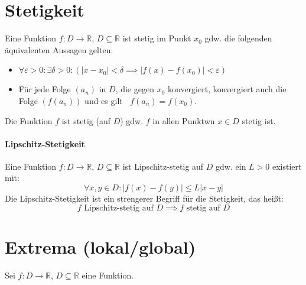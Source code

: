 \documentclass[a4paper, 11pt, accentcolor = tud3b]{tudreport}
\DeclareMathOperator{\liminfty}{\lim _ { n \rightarrow \infty }}
\newcommand{\func}[1]{$ #1 : D \rightarrow \mathbb{R} $, $ D \subseteq \mathbb{R} $}
\begin{document}
        \section{Stetigkeit}
            Eine Funktion \func{f} ist stetig im Punkt $ x _ 0 $ gdw. die folgenden äquivalenten Aussagen gelten:
            \begin{itemize}
                \item $ \forall \varepsilon > 0 : \exists \delta > 0 : (\lvert x - x _ 0 \rvert < \delta \implies \lvert f(x) - f(x _ 0) \rvert < \varepsilon) $
                \item Für jede Folge $ (a _ n) $ in $ D $, die gegen $ x _ 0 $ konvergiert, konvergiert auch die Folge $ (f(a _ n)) $ und es gilt $ \liminfty f(a _ n) = f(x _ 0) $.
            \end{itemize}
            Die Funktion $ f $ ist stetig (auf $ D $) gdw. $ f $ in allen Punktwn $ x \in D $ stetig ist.

            \paragraph{Lipschitz-Stetigkeit}
                Eine Funktion \func{f} ist Lipschitz-stetig auf $ D $ gdw. ein $ L > 0 $ existiert mit:
                \begin{equation}
                    \forall x, y \in D : \lvert f(x) - f(y) \rvert \leq L \lvert x - y \rvert
                \end{equation}
                Die Lipschitz-Stetigkeit ist ein strengerer Begriff für die Stetigkeit, das heißt: \[ f \text{ Lipschitz-stetig auf } D \implies f \text{ stetig auf } D \]

        \section{Extrema (lokal/global)}
            Sei \func{f} eine Funktion.
\end{document}
